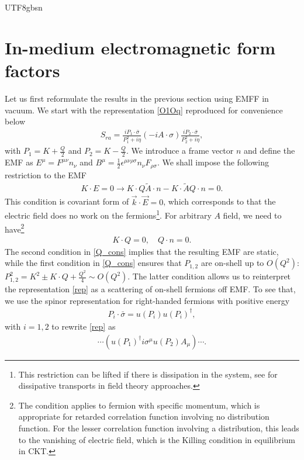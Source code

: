 \documentclass[11pt]{article}\def\baselinestretch{1.4}
\def\e{{\epsilon}}
\def\h{\eta}
\def\m{{\mu}}
\def\n{{\nu}}
\def\r{{\rho}}
\def\s{{\sigma}}
\def\({\left(}
\def\){\right)}
\newcommand{\dg}{\dagger}
\begin{document}
\begin{CJK}{UTF8}{gbsn}
\section{In-medium electromagnetic form factors}\label{sec_3}

Let us first reformulate the results in the previous section using EMFF in vacuum. We start with the representation \eqref{O1Oq} reproduced for convenience below
\begin{align}\label{rep}
S_{ra}=\frac{iP_1\cdot\bar{\s}}{P_1^2+i\h}(-i A\cdot\s)\frac{iP_2\cdot\bar{\s}}{P_2^2+i\h},
\end{align}
with $P_1=K+\frac{Q}{2}$ and $P_2=K-\frac{Q}{2}$. We introduce a frame vector $n$ and define the EMF as $E^\m=F^{\m\n}n_\n$ and $B^\m=\frac{1}{2}\e^{\m\n\r\s}n_\n F_{\r\s}$. We shall impose the following restriction to the EMF
\begin{align}
K\cdot E=0\to K\cdot Q \tilde{A}\cdot n-K\cdot \tilde{A} Q\cdot n=0.
\end{align}
This condition is covariant form of $\vec{k}\cdot\vec{E}=0$, which corresponds to that the electric field does no work on the fermions\footnote{This restriction can be lifted if there is dissipation in the system, see \cite{Gagnon:2006hi,Gagnon:2007qt} for dissipative transports in field theory approaches.}. For arbitrary $A$ field, we need to have\footnote{The condition applies to fermion with specific momentum, which is appropriate for retarded correlation function involving no distribution function. For the lesser correlation function involving a distribution, this leads to the vanishing of electric field, which is the Killing condition in equilibrium in CKT.}
\begin{align}\label{Q_cons}
K\cdot Q=0,\quad Q\cdot n=0.
\end{align}
The second condition in \eqref{Q_cons} implies that the resulting EMF are static, while the first condition in \eqref{Q_cons} ensures that $P_{1,2}$ are on-shell up to $O(Q^2)$: $P_{1,2}^2=K^2\pm K\cdot Q+\frac{Q^2}{4}\sim O(Q^2)$. The latter condition allows us to reinterpret the representation \eqref{rep} as a scattering of on-shell fermions off EMF. To see that, we use the spinor representation for right-handed fermions with positive energy
\begin{align}
P_i\cdot\bar{\s}=u(P_i)u(P_i)^\dg,
\end{align}
with $i=1,2$ to rewrite \eqref{rep} as
\begin{align}\label{scat}
\cdots\(u(P_1)^\dg i\s^\m u(P_2)A_\m\)\cdots.
\end{align}

\end{CJK}
\end{document}
